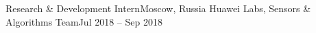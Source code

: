 \resumeSubheading
  {Research \& Development Intern}{Moscow, Russia}
  {Huawei Labs, Sensors \& Algorithms Team}{Jul 2018 -- Sep 2018}
  \begin{itemize}[leftmargin=0in, label={}]
  \end{itemize}